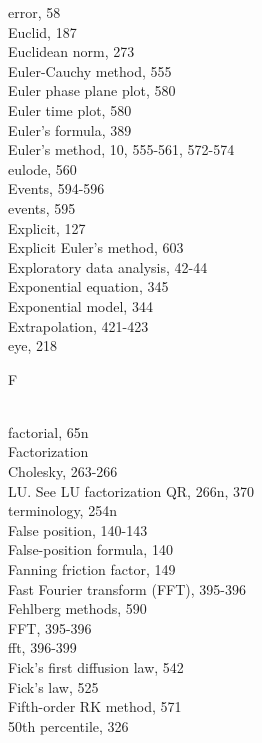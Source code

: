 \documentclass[../main.tex]{subfiles}
\begin{document}
\begin{multicols}{3}
    error, 58\\
    Euclid, 187\\
    Euclidean norm, 273\\
    Euler-Cauchy method, 555\\
    Euler phase plane plot, 580\\
    Euler time plot, 580\\
    Euler's formula, 389\\
    Euler's method, 10, 555-561, 572-574\\
    eulode, 560\\
    Events, 594-596\\
    events, 595\\
    Explicit, 127\\
    Explicit Euler's method, 603\\
    Exploratory data analysis, 42-44\\
    Exponential equation, 345\\
    Exponential model, 344\\
    Extrapolation, 421-423\\
    eye, 218\vspace*{2mm}\\
    \begin{huge} F \end{huge}\\
    factorial, 65n\\
    Factorization\\
    \hspace*{3mm}Cholesky, 263-266\\
    \hspace*{3mm}LU. See LU factorization QR, 266n, 370\\
    \hspace*{3mm}terminology, 254n\\
    False position, 140-143\\
    False-position formula, 140\\
    Fanning friction factor, 149\\
    Fast Fourier transform (FFT), 395-396\\
    Fehlberg methods, 590\\
    FFT, 395-396\\
    fft, 396-399\\
    Fick's first diffusion law, 542\\
    Fick's law, 525\\
    Fifth-order RK method, 571\\50th percentile, 326

\end{multicols}
\end{document}

